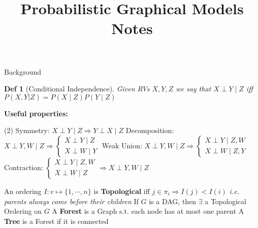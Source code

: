 \documentclass[a4paper, columns=2, hidelinks]{cheatsheet}
\title{Probabilistic Graphical Models Notes}
\theoremstyle{propstyle}
\theoremstyle{defstyle}
\newtheorem{definition}{Def}
\begin{document}
\onecolumn
\setlength{\abovedisplayskip}{0pt}
\setlength{\belowdisplayskip}{0pt}
\setlength{\abovedisplayshortskip}{0pt}
\setlength{\belowdisplayshortskip}{0pt}
\setlength{\jot}{0pt}

\maketitle

\begin{Section}{Background}{}
\begin{definition}[Conditional Independence]
Given RVs $X, Y, Z$ we say that $X 	\perp Y \mid Z$ iff $P(X, Y| Z) = P(X \mid Z)P(Y \mid Z)$
\end{definition}
\bfseries  \normalfont Useful properties:
		\begin{tasks}(2)
			\task Symmetry: $X \perp Y \mid Z \Rightarrow Y \perp X \mid Z$
			\task Decomposition: $X \perp Y,W \mid Z \Rightarrow 
			\begin{cases}
			X \perp Y \mid Z \\
			X \perp W \mid Y
			\end{cases}$ 
			\task Weak Union: $X \perp Y,W \mid Z \Rightarrow 	
			\begin{cases}
			X \perp Y \mid Z, W \\
			X \perp W \mid Z, Y
			\end{cases}$
			\task Contraction: $\begin{cases}
			X \perp Y \mid Z,W \\
			X \perp W \mid Z
			\end{cases}
			\Rightarrow X \perp Y, W \mid Z
			$
		\end{tasks}
An ordering \(I: v \mapsto \{1,\cdots,n\}\) is \textbf{Topological} iff \(j \in \pi_i \Rightarrow I(j) < I(i)\) \emph{i.e. parents always come before their children}
If \(G\) is a DAG, then \(\exists\) a Topological Ordering on \(G\)
A \textbf{Forest} is a Graph s.t. each node has at most one parent
A \textbf{Tree} is a Forest if it is connected
\end{Section}
\end{document}
